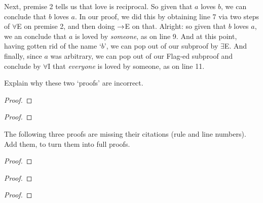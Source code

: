 Next, premise 2 tells us that love is reciprocal.  So given that $a$ loves $b$, we can conclude that $b$ loves $a$.  In our proof, we did this by obtaining line 7 via two steps of $\forall$E on premise 2, and then doing $\rightarrow$E on that.  Alright: so given that $b$ loves $a$, we an conclude that $a$ is loved by \emph{someone}, as on line 9. And at this point, having gotten rid of the name `$b$', we can pop out of our subproof by $\exists$E.  And finally, since $a$ was arbitrary, we can pop out of our Flag-ed subproof and conclude by $\forall$I that \emph{everyone} is loved by someone, as on line 11. 


\practiceproblems
\problempart
Explain why these two `proofs' are incorrect. %
\begin{multicols}{2}
	\begin{proof}
	\end{proof}
	\begin{proof}
		\open
		\close
	\end{proof}
\end{multicols}

\problempart 
\label{pr.justifyFOLproof}
The following three proofs are missing their citations (rule and line numbers). Add them, to turn them into full proofs. 
\begin{proof}
	\open
	\close
{} {}
\end{proof}
\begin{multicols}{2}
\begin{proof}
 {}
 {}
\end{proof}
\begin{proof}
\open
\close
{}
\end{proof}
\end{multicols}


